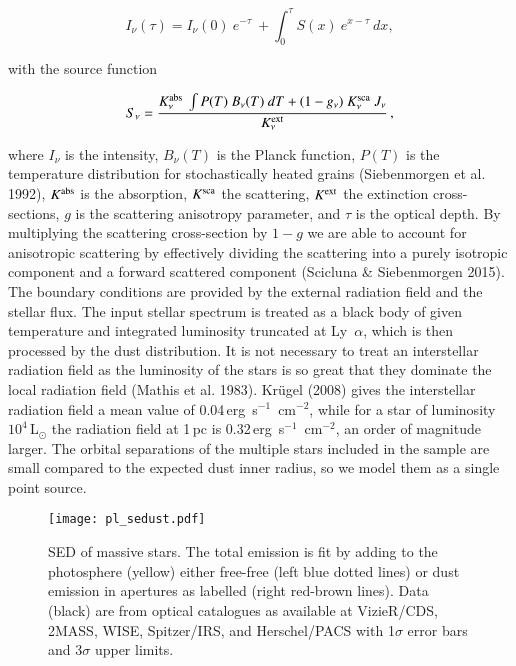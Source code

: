 \documentclass[tradiabstract]{aa} %
\newcommand{\Lsun} {L$_{\odot}$}
\begin{document}
\begin {equation}
 I_{\nu}(\tau) =  I_{\nu}(0) \ e^{- \tau} \ + \int_0^{\tau} S(x) \ e^{x - \tau} \ dx 
,\end {equation}

with the source function

\begin {equation}
 S_{\nu} = \frac{K^{\rm{abs}}_{\nu} \ \int{P(T) \ B_{\nu}(T)\ dT} + (1 - g_{\nu})\ K^{\rm{sca}}_{\nu} \ J_{\nu} }{K^{\rm{ext}}_{\nu}} \, 
,\end {equation}

where $I_{\nu}$ is the intensity, $B_{\nu}(T)$ is the Planck function,
$P(T)$ is the temperature distribution for stochastically heated
grains (Siebenmorgen et al. 1992), $K^{\rm{abs}}$ is the absorption,
$K^{\rm{sca}}$ the scattering, $K^{\rm{ext}}$ the extinction
cross-sections, $g$ is the scattering anisotropy
parameter, and $\tau$ is the optical depth. By multiplying the
scattering cross-section by $1 - g$ we are able to account for
anisotropic scattering by effectively dividing the scattering into a
purely isotropic component and a forward scattered component (Scicluna
\& Siebenmorgen 2015). The boundary conditions are provided by the
external radiation field and the stellar flux. The input stellar
spectrum is treated as a black body of given temperature and
integrated luminosity truncated at Ly~$\alpha$, which is then processed
by the dust distribution.  It is not necessary to treat an
interstellar radiation field as the luminosity of the stars is so
great that they dominate the local radiation field (Mathis et
al. 1983). Kr\"ugel (2008) gives the interstellar
radiation field a mean value of 0.04\,erg~s$^{-1}$~cm$^{-2}$, while for a star of luminosity
$10^4$\,\Lsun \/ the radiation field at 1\,pc is 0.32\,erg~s$^{-1}$~cm$^{-2}$, an
order of magnitude larger. The orbital separations of the multiple
stars included in the sample are small compared to the expected dust
inner radius, so we model them as a single point source.  


\begin{figure*} [htb]
\texttt{[image: pl\_sedust.pdf]}
\caption{SED of massive stars. The total emission is fit by adding to
  the photosphere (yellow) either free-free (left blue dotted lines) or
  dust emission in apertures as labelled (right red-brown lines). Data
  (black) are from optical catalogues as available at VizieR/CDS,
  2MASS, WISE, Spitzer/IRS, and Herschel/PACS with 1$\sigma$ error
  bars and 3$\sigma$ upper limits. \label{pl_sedust.fig}}
\end{figure*}
\end{document}
